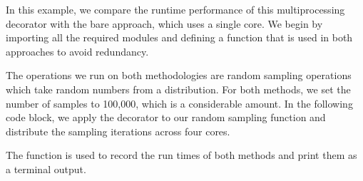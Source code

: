 \documentclass[letterpaper,10pt,english]{sphinxmanual}
\begin{document}
\sphinxAtStartPar
In this example, we compare the runtime performance of this multiprocessing decorator with the bare approach,
which uses a single core. We begin by importing all the required modules and defining a function that is used
in both approaches to avoid redundancy.

\begin{sphinxVerbatim}[commandchars=\\\{\}]
   
   
   
   

  
\end{sphinxVerbatim}

\sphinxAtStartPar
The operations we run on both methodologies are random sampling operations which take random numbers from a distribution.
For both methods, we set the number of samples to 100,000, which is a considerable amount.
In the following code block, we apply the  decorator to our random sampling function 
and distribute the sampling iterations across four cores.

\sphinxAtStartPar
The  function is used to record the run times of both methods and print them as a terminal output.
\end{document}
